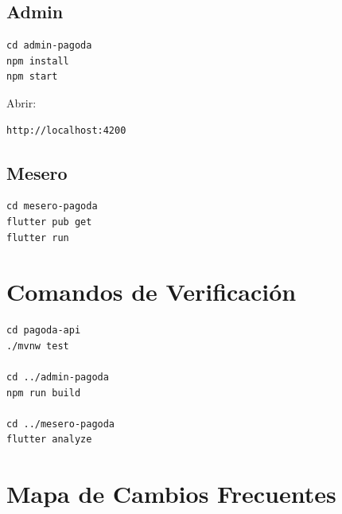 \documentclass[11pt,letterpaper,openany]{report}
\begin{document}
\subsection{Admin}

\begin{lstlisting}
cd admin-pagoda
npm install
npm start
\end{lstlisting}

Abrir:

\begin{lstlisting}
http://localhost:4200
\end{lstlisting}

\subsection{Mesero}

\begin{lstlisting}
cd mesero-pagoda
flutter pub get
flutter run
\end{lstlisting}

\section{Comandos de Verificación}

\begin{lstlisting}
cd pagoda-api
./mvnw test

cd ../admin-pagoda
npm run build

cd ../mesero-pagoda
flutter analyze
\end{lstlisting}

\section{Mapa de Cambios Frecuentes}
\end{document}
